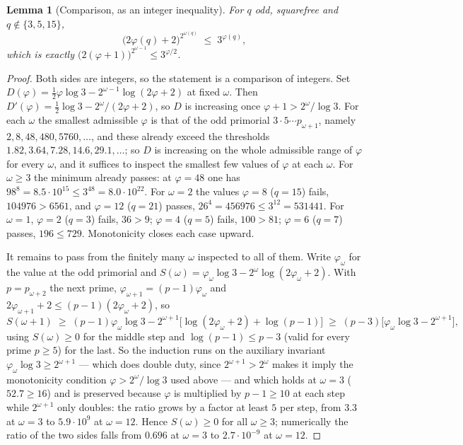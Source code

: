 \documentclass[11pt,a4paper]{article}
\theoremstyle{plain}
\newtheorem{lemma}[theorem]{Lemma}
\theoremstyle{definition}
\theoremstyle{remark}
\begin{document}
\begin{lemma}[Comparison, as an integer inequality]\label{lem:l1small}
For $q$ odd, squarefree and $q\notin\{3,5,15\}$,
\[
  \bigl(2\varphi(q)+2\bigr)^{2^{\omega(q)}}\;\le\;3^{\varphi(q)},
\]
which is exactly $\bigl(2(\varphi+1)\bigr)^{2^{\omega-1}}\le3^{\varphi/2}$.
\end{lemma}

\begin{proof}
Both sides are integers, so the statement is a comparison of integers. Set
$D(\varphi)=\tfrac12\varphi\log3-2^{\omega-1}\log(2\varphi+2)$ at fixed
$\omega$. Then $D'(\varphi)=\tfrac12\log3-2^{\omega}/(2\varphi+2)$, so $D$ is
increasing once $\varphi+1>2^{\omega}/\log3$. For each $\omega$ the smallest
admissible $\varphi$ is that of the odd primorial $3\cdot5\cdots p_{\omega+1}$,
namely $2,8,48,480,5760,\dots$, and these already exceed the thresholds
$1.82,3.64,7.28,14.6,29.1,\dots$; so $D$ is increasing on the whole admissible
range of $\varphi$ for every $\omega$, and it suffices to inspect the smallest
few values of $\varphi$ at each $\omega$. For $\omega\ge3$ the minimum already
passes: at $\varphi=48$ one has $98^{8}=8.5\cdot10^{15}\le3^{48}=8.0\cdot10^{22}$.
For $\omega=2$ the values $\varphi=8$ ($q=15$) fails, $104976>6561$, and
$\varphi=12$ ($q=21$) passes, $26^{4}=456976\le3^{12}=531441$. For $\omega=1$,
$\varphi=2$ ($q=3$) fails, $36>9$; $\varphi=4$ ($q=5$) fails, $100>81$;
$\varphi=6$ ($q=7$) passes, $196\le729$. Monotonicity closes each case upward.

It remains to pass from the finitely many $\omega$ inspected to all of them.
Write $\varphi_\omega$ for the value at the odd primorial and
$S(\omega)=\varphi_\omega\log3-2^{\omega}\log(2\varphi_\omega+2)$. With
$p=p_{\omega+2}$ the next prime, $\varphi_{\omega+1}=(p-1)\varphi_\omega$ and
$2\varphi_{\omega+1}+2\le(p-1)(2\varphi_\omega+2)$, so
\[
  S(\omega+1)\;\ge\;(p-1)\varphi_\omega\log3-2^{\omega+1}
     \bigl[\log(2\varphi_\omega+2)+\log(p-1)\bigr]
  \;\ge\;(p-3)\bigl[\varphi_\omega\log3-2^{\omega+1}\bigr],
\]
using $S(\omega)\ge0$ for the middle step and $\log(p-1)\le p-3$ (valid for
every prime $p\ge5$) for the last. So the induction runs on the auxiliary
invariant $\varphi_\omega\log3\ge2^{\omega+1}$ --- which does double duty, since
$2^{\omega+1}>2^{\omega}$ makes it imply the monotonicity condition
$\varphi>2^{\omega}/\log3$ used above --- and which holds at $\omega=3$
($52.7\ge16$) and is preserved because $\varphi$ is multiplied by
$p-1\ge10$ at each step while $2^{\omega+1}$ only doubles: the ratio grows by a
factor at least $5$ per step, from $3.3$ at $\omega=3$ to $5.9\cdot10^{9}$ at
$\omega=12$. Hence $S(\omega)\ge0$ for all $\omega\ge3$; numerically the ratio
of the two sides falls from $0.696$ at $\omega=3$ to $2.7\cdot10^{-9}$ at
$\omega=12$.
\end{proof}
\end{document}
